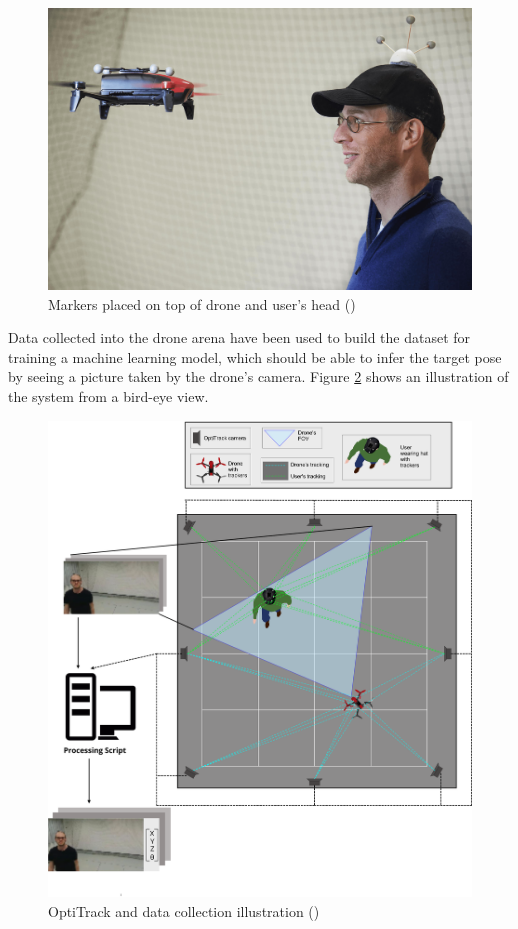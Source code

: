 \begin{figure}[!h]
	\centering
	\includegraphics[width=1\textwidth]{"contents/images/03-drone-facing"}
	\caption[Markers placed on top of drone and user's head]{Markers placed on top of drone and user's head (\cite{mantegazza2018thesis})}
	\label{fig:drone-facing}
\end{figure}

Data collected into the drone arena have been used to build the dataset for training a machine learning model, which should be able to infer the target pose by seeing a picture taken by the drone's camera. Figure \ref{fig:drone-demo-2} shows an illustration of the system from a bird-eye view.

\begin{figure}[!htb]
	\centering
	\includegraphics[width=1\textwidth]{"contents/images/03-arena-demo-2"}
	\caption[OptiTrack and data collection illustration]{OptiTrack and data collection illustration (\cite{mantegazza2018thesis})}
	\label{fig:drone-demo-2}
\end{figure}




